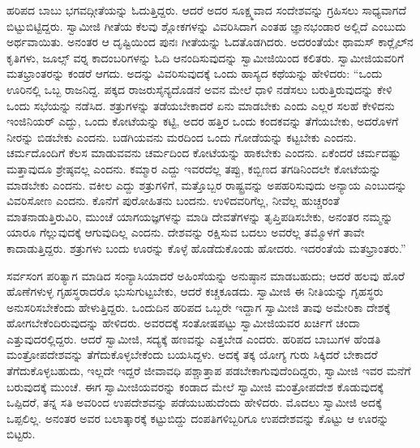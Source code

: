  ಹರಿಪದ ಬಾಬು ಭಗವದ್ಗೀತೆಯನ್ನು ಓದುತ್ತಿದ್ದರು. ಆದರೆ ಅದರ ಸೂಕ್ಷ್ಮವಾದ ಸಂದೇಶವನ್ನು ಗ್ರಹಿಸಲು ಸಾಧ್ಯವಾಗದೆ ಬಿಟ್ಟುಬಿಟ್ಟಿದ್ದರು. ಸ್ವಾಮೀಜಿ ಗೀತೆಯ ಕೆಲವು ಶ್ಲೋಕಗಳನ್ನು ವಿವರಿಸಿದಾಗ ಎಂತಹ ಜ್ಞಾನಭಂಡಾರ ಅಲ್ಲಿದೆ ಎಂಬುದು ಅರ್ಥವಾಯಿತು. ಅನಂತರ ಆ ದೃಷ್ಟಿಯಿಂದ ಪುನಃ ಗೀತೆಯನ್ನು ಓದತೊಡಗಿದರು. ಅದರಂತೆಯೇ ಥಾಮಸ್ ಕಾರ‍್ಲೈಲ್‍ನ ಕೃತಿಗಳು, ಜೂಲ್ಸ್ ‍ವರ‍್ನ ಕಾದಂಬರಿಗಳನ್ನು ಓದಿ ಆನಂದಿಸುವುದನ್ನು ಸ್ವಾಮೀಜಿಯಿಂದ ಕಲಿತರು. ಸ್ವಾಮೀಜಿಯವರಿಗೆ ಮತಭ್ರಾಂತರನ್ನು ಕಂಡರೆ ಆಗದು. ಅದನ್ನು ವಿವರಿಸುವುದಕ್ಕೆ ಒಂದು ಹಾಸ್ಯದ ಕಥೆಯನ್ನು ಹೇಳಿದರು: “ಒಂದು ಊರಿನಲ್ಲಿ ಒಬ್ಬ ರಾಜನಿದ್ದ. ಪಕ್ಕದ ರಾಜರು\break ಸೈನ್ಯದೊಡನೆ ಅವನ ಮೇಲೆ ಧಾಳಿ ನಡೆಸಲು ಬರುತ್ತಿರುವುದನ್ನು ಕೇಳಿ ಒಂದು ಸಭೆಯನ್ನು ನಡೆಸಿದ. ಶತ್ರುಗಳನ್ನು ತಡೆಯಬೇಕಾದರೆ ಏನು ಮಾಡಬೇಕು ಎಂದು ಎಲ್ಲರ ಸಲಹೆ ಕೇಳಿದನು ಇಂಜಿನಿಯರ್ ಎದ್ದು, ಒಂದು ಕೋಟೆಯನ್ನು ಕಟ್ಟಿ, ಅದರ ಹತ್ತಿರ ಒಂದು ಕಂದಕವನ್ನು ತೆಗೆಯಬೇಕು, ಅದರೊಳಗೆ ನೀರನ್ನು ಬಿಡಬೇಕು ಎಂದನು. ಬಡಗಿಯವನು ಮರದಿಂದ ಒಂದು ಗೋಡೆಯನ್ನು ಕಟ್ಟಬೇಕು ಎಂದನು. ಚರ್ಮದೊಂದಿಗೆ ಕೆಲಸ ಮಾಡುವವನು ಚರ್ಮದಿಂದ ಕೋಟೆಯನ್ನು ಹಾಕಬೇಕು ಎಂದನು. ಏಕೆಂದರೆ ಚರ್ಮದಷ್ಟು ಮತ್ತಾವುದೂ ಶ್ರೇಷ್ಠವಲ್ಲ ಎಂದನು. ಕಮ್ಮಾರ ಎದ್ದು ಇವರದೆಲ್ಲ ತಪ್ಪು, ಕಬ್ಬಿಣದ ತಗಡಿನಿಂದಲೇ ಕೋಟೆಯನ್ನು ಮಾಡಬೇಕು ಎಂದನು. ವಕೀಲ ಎದ್ದು ಶತ್ರುಗಳಿಗೆ, ಮತ್ತೊಬ್ಬರ ರಾಷ್ಟ್ರವನ್ನು ಅಪಹರಿಸುವುದು ಅನ್ಯಾಯ ಎಂಬುದನ್ನು ವಿವರಿಸೋಣ ಎಂದನು. ಕೊನೆಗೆ ಪುರೋಹಿತನು ಬಂದನು. ಉಳಿದವರಿಗೆಲ್ಲ, ನೀವೆಲ್ಲ ಹುಚ್ಚರಂತೆ ಮಾತನಾಡುತ್ತಿರುವಿರಿ, ಮುಂಚೆ ಯಾಗಯಜ್ಞಗಳನ್ನು ಮಾಡಿ ದೇವತೆಗಳನ್ನು ತೃಪ್ತಿಪಡಿಸಬೇಕು, ಅನಂತರ ನಮ್ಮನ್ನು ಯಾರೂ ಗೆಲ್ಲುವುದಕ್ಕೆ ಆಗುವುದಿಲ್ಲ ಎಂದನು. ದೇಶವನ್ನು ರಕ್ಷಿಸುವ ಬದಲು ಅವರೆಲ್ಲ ತಮ್ಮೊಳಗೆ ತಾವೇ ಕಾದಾಡುತ್ತಿದ್ದರು. ಶತ್ರುಗಳು ಬಂದು ಊರನ್ನು ಕೊಳ್ಳೆ ಹೊಡೆದುಕೊಂಡು ಹೋದರು. ಇದರಂತೆಯೆ ಮತಭ್ರಾಂತರು.” 

 ಸರ್ವಸಂಗ ಪರಿತ್ಯಾಗ ಮಾಡಿದ ಸಂನ್ಯಾಸಿಯಾದರೆ ಅಹಿಂಸೆಯನ್ನು ಅನುಷ್ಠಾನ ಮಾಡಬಹುದು; ಆದರೆ ಹಲವು ಹೊರೆ ಹೊಣೆಗಳುಳ್ಳ ಗೃಹಸ್ಥರಾದರೊ ಭುಸುಗುಟ್ಟಬೇಕು, ಆದರೆ ಕಚ್ಚಕೂಡದು. ಸ್ವಾಮೀಜಿ ಈ ನೀತಿಯನ್ನು ಗೃಹಸ್ಥರು ಅನುಸರಿಸಬೇಕೆಂದು ಹೇಳುತ್ತಿದ್ದರು. ಒಂದುದಿನ ಹರಿಪದ ಒಬ್ಬರೇ ಇದ್ದಾಗ ಸ್ವಾಮೀಜಿ ತಾವು ಅಮೇರಿಕಾ ದೇಶಕ್ಕೆ ಹೋಗಬೇಕೆಂದಿರುವುದನ್ನು ಹೇಳಿದರು. ಅವರದಕ್ಕೆ ಸಂತೋಷಪಟ್ಟು ಸ್ವಾಮೀಜಿಯವರ ಖರ್ಚಿಗೆ ಚಂದಾ ಎತ್ತುವುದರಲ್ಲಿದ್ದರು. ಆದರೆ ಸ್ವಾಮೀಜಿ, ಸದ್ಯಕ್ಕೆ ಹಣವನ್ನು ಎತ್ತಬೇಡ ಎಂದರು. ಹರಿಪದ ಬಾಬುಗಳ ಹೆಂಡತಿ ಮಂತ್ರೋಪದೇಶವನ್ನು ತೆಗೆದುಕೊಳ್ಳಬೇಕೆಂದು ಬಯಸಿದ್ದಳು. ಅದಕ್ಕೆ ತಕ್ಕ ಯೋಗ್ಯ ಗುರು ಸಿಕ್ಕಿದರೆ ಬೇಕಾದರೆ ತೆಗೆದುಕೊಳ್ಳಬಹುದು, ಇಲ್ಲದೇ ಇದ್ದರೆ ಜೀವಾವಧಿ ಪಶ್ಚಾತ್ತಾಪ ಪಡಬೇಕಾಗುವುದೆಂದಿದ್ದರು, ಸ್ವಾಮೀಜಿ ಇವರ ಮನೆಗೆ ಬರುವುದಕ್ಕೆ ಮುಂಚೆ. ಈಗ ಸ್ವಾಮೀಜಿಯವರನ್ನು ಕಂಡಾದ ಮೇಲೆ ಸ್ವಾಮೀಜಿ ಮಂತ್ರೋಪದೇಶ ಕೊಡುವುದಕ್ಕೆ ಒಪ್ಪಿದರೆ, ತನ್ನ ಸತಿ ಅವರಿಂದ ಉಪದೇಶವನ್ನು ಪಡೆಯಬಹುದೆಂದು ಹೇಳಿದರು. ಮೊದಲು ಸ್ವಾಮೀಜಿ ಅದಕ್ಕೆ ಒಪ್ಪಲಿಲ್ಲ. ಅನಂತರ ಅವರ ಬಲಾತ್ಕಾರಕ್ಕೆ ಕಟ್ಟುಬಿದ್ದು ದಂಪತಿಗಳಿಬ್ಬರಿಗೂ ಉಪದೇಶವನ್ನು ಕೊಟ್ಟು ಆ ಊರನ್ನು ಬಿಟ್ಟರು. 

